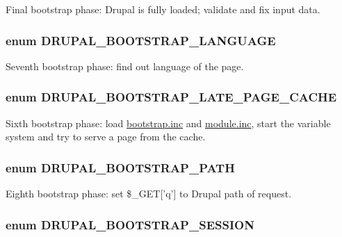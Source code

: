 Final bootstrap phase: Drupal is fully loaded; validate and fix input data. \hypertarget{bootstrap_8inc_e4a0a1bc1243082285abc3fc052e5d38}{
\subsubsection[{DRUPAL\_\-BOOTSTRAP\_\-LANGUAGE}]{\setlength{\rightskip}{0pt plus 5cm}enum {\bf DRUPAL\_\-BOOTSTRAP\_\-LANGUAGE}}}
\label{bootstrap_8inc_e4a0a1bc1243082285abc3fc052e5d38}


Seventh bootstrap phase: find out language of the page. \hypertarget{bootstrap_8inc_ddfe2406691de4bbb8fceba3ac83ee1a}{
\subsubsection[{DRUPAL\_\-BOOTSTRAP\_\-LATE\_\-PAGE\_\-CACHE}]{\setlength{\rightskip}{0pt plus 5cm}enum {\bf DRUPAL\_\-BOOTSTRAP\_\-LATE\_\-PAGE\_\-CACHE}}}
\label{bootstrap_8inc_ddfe2406691de4bbb8fceba3ac83ee1a}


Sixth bootstrap phase: load \hyperlink{bootstrap_8inc}{bootstrap.inc} and \hyperlink{module_8inc}{module.inc}, start the variable system and try to serve a page from the cache. \hypertarget{bootstrap_8inc_4366634a7ebd903c25d1f04737f17f4f}{
\subsubsection[{DRUPAL\_\-BOOTSTRAP\_\-PATH}]{\setlength{\rightskip}{0pt plus 5cm}enum {\bf DRUPAL\_\-BOOTSTRAP\_\-PATH}}}
\label{bootstrap_8inc_4366634a7ebd903c25d1f04737f17f4f}


Eighth bootstrap phase: set \$\_\-GET\mbox{[}'q'\mbox{]} to Drupal path of request. \hypertarget{bootstrap_8inc_a6c510376f042cd2d05fc9bb458e7138}{
\subsubsection[{DRUPAL\_\-BOOTSTRAP\_\-SESSION}]{\setlength{\rightskip}{0pt plus 5cm}enum {\bf DRUPAL\_\-BOOTSTRAP\_\-SESSION}}}
\label{bootstrap_8inc_a6c510376f042cd2d05fc9bb458e7138}


